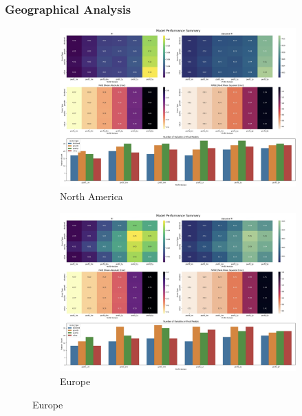 \documentclass[11pt,english,a4paper,hidelinks]{book}
\begin{document}
\subsubsection{Geographical Analysis}
\begin{figure}[H]
    \centering
    \begin{subfigure}[b]{0.48\textwidth}
        \centering
        \includegraphics[width=\textwidth]{images/code/models/linear_regression/first_model/USA - performance.png}
        \caption{North America}
    \end{subfigure}
    \hfill
    \begin{subfigure}[b]{0.48\textwidth}
        \centering
        \includegraphics[width=\textwidth]{images/code/models/linear_regression/first_model/EU - performance.png}
        \caption{Europe}
    \end{subfigure}


\end{figure}
\end{document}
